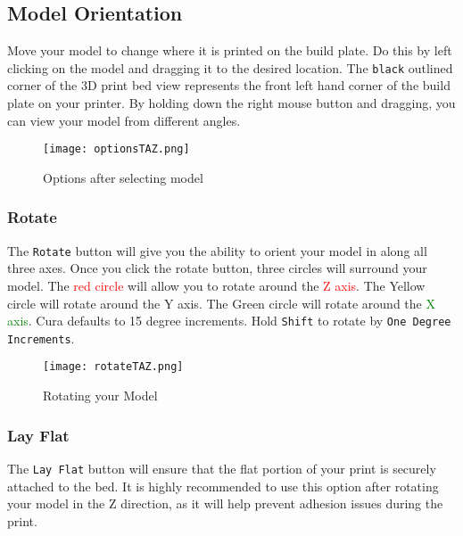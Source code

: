 \subsection{Model Orientation}
Move your model to change where it is printed on the build plate. Do this by left clicking on the model and dragging it to the desired location. The \texttt{black} outlined corner of the 3D print bed view represents the front left hand corner of the build plate on your printer. By holding down the right mouse button and dragging, you can view your model from different angles. %
\begin{figure}[H]
\centering
\texttt{[image: optionsTAZ.png]}
\caption{Options after selecting model}
\label{fig:Orientation}
\end{figure}

\subsubsection{Rotate}
The \texttt{Rotate} button will give you the ability to orient your model in along all three axes. Once you click the rotate button, three circles will surround your model. The \textcolor{red}{red circle} will allow you to rotate around the \textcolor{red}{Z axis}. The \textcolor{yellow1}{Yellow circle} will rotate around the \textcolor{yellow1}{Y axis}. The \textcolor{green1}{Green circle} will rotate around the \textcolor{green}{X axis}. Cura defaults to 15 degree increments. Hold \texttt{Shift} to rotate by \texttt{One Degree Increments}.
\begin{figure}[H]
\centering
\texttt{[image: rotateTAZ.png]}
\caption{Rotating your Model}
\label{fig:Rotating your Model}
\end{figure}

\subsubsection{Lay Flat}
The \texttt{Lay Flat} button will ensure that the flat portion of your print is securely attached to the bed. It is highly recommended to use this option after rotating your model in the Z direction, as it will help prevent adhesion issues during the print.

